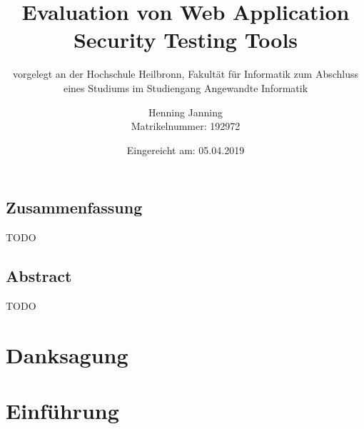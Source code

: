 \documentclass[12pt,oneside,a4paper,parskip]{scrbook}
\def\BaAuthor{Henning Janning}
\def\BaTitle{Evaluation von Web Application Security Testing Tools}
\def\BaSupervisorOne{Prof. Andreas Mayer}
\def\BaSupervisorTwo{Susanne Steuer (M.Sc.) }
\def\BaDeadline{05.04.2019}
\def\MatNr{192972}
\begin{document}



\frontmatter
\titlehead{%
  {Hochschule Heilbronn\\
   Fakultät für Informatik}}
\subject{Bachelorarbeit}
\title{\BaTitle\\[15mm]}
\subtitle{\normalsize{vorgelegt an der Hochschule Heilbronn, Fakultät für Informatik zum Abschluss eines Studiums im Studiengang Angewandte Informatik}}
\author{\BaAuthor\\
\normalsize{Matrikelnummer: \MatNr}}
\date{\normalsize{Eingereicht am: \BaDeadline}}
\publishers{
  \normalsize{Erstpr\"{u}fer: \BaSupervisorOne}\\
  \normalsize{Zweitpr\"{u}ferin: \BaSupervisorTwo}\\
}


\maketitle



\section*{Zusammenfassung}

TODO

\section*{Abstract}

TODO

\newpage
\chapter*{Danksagung}



\tableofcontents



\mainmatter

\chapter{Einführung}\label{ch:intro}
\end{document}
